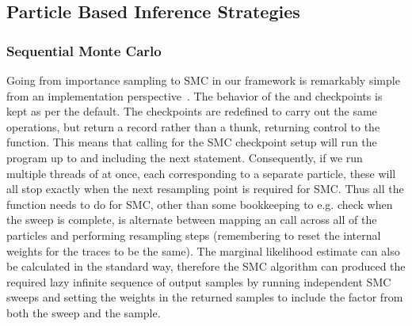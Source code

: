 
\subsection{Particle Based Inference Strategies}
\label{sec:proginf:str:part}

\subsubsection{Sequential Monte Carlo}
\label{sec:proginf:str:part:smc}

Going from importance sampling to SMC in our framework is remarkably simple
from an implementation perspective~\citep{wood2014new}.  The behavior of the \sample and  
checkpoints is kept as per the default.  
The \observe checkpoints are redefined
to carry out the same operations, but return a  record rather
than a thunk, returning control to the \anginfer function.  This means that 
calling  for the SMC checkpoint setup will run the program up to and including
the next \observe statement.  Consequently, if we run multiple threads of  at
once, each corresponding to a separate particle, these will all stop exactly when
the next resampling point is required for SMC.  Thus all the \anginfer function needs
to do for SMC, other than some bookkeeping to e.g. check when the sweep is complete,
is alternate between mapping an  call across all of the particles and
performing resampling steps (remembering to reset the internal weights for the traces to
be the same).  The marginal likelihood estimate can also be calculated in
the standard way, therefore the SMC algorithm can produced the required lazy infinite sequence
of output samples by running independent SMC sweeps and setting the weights in the returned
samples to include the factor from both the sweep and the sample.

